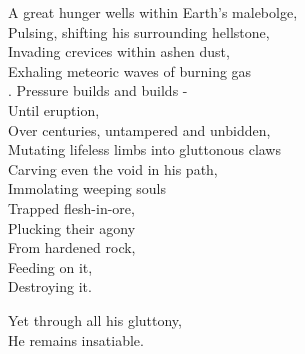 A great hunger wells within Earth's malebolge,\\
Pulsing, shifting his surrounding hellstone,\\
Invading crevices within ashen dust,\\
Exhaling meteoric waves of burning gas\\.
Pressure builds and builds -\\
Until eruption,\\
Over centuries, untampered and unbidden,\\
Mutating lifeless limbs into gluttonous claws\\
Carving even the void in his path,\\
Immolating weeping souls\\
Trapped flesh-in-ore,\\
Plucking their agony\\
From hardened rock,\\
Feeding on it,\\
Destroying it.

Yet through all his gluttony,\\
He remains insatiable.